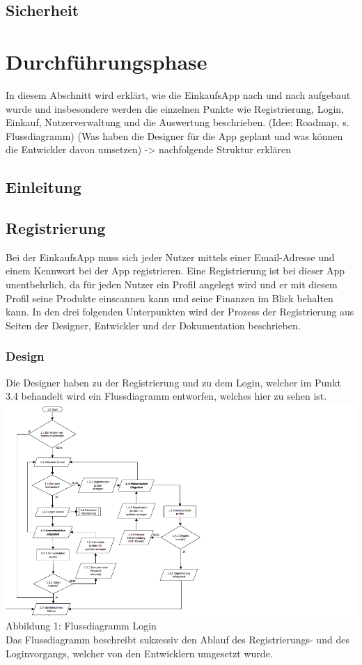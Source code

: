\documentclass[12pt,a4paper]{article}
\begin{document}
\subsection{Sicherheit}
\newpage
\section{Durchführungsphase}
In diesem Abschnitt wird erklärt, wie die EinkaufsApp nach und nach aufgebaut wurde und insbesondere werden die einzelnen Punkte wie Registrierung, Login, Einkauf, Nutzerverwaltung und die Auswertung beschrieben.
(Idee: Roadmap, s. Flussdiagramm) (Was haben die Designer für die App geplant und was können die Entwickler davon umsetzen) -> nachfolgende Struktur erklären
\subsection*{Einleitung}
\newpage
\subsection{Registrierung}
Bei der EinkaufsApp muss sich jeder Nutzer mittels einer Email-Adresse und einem Kennwort bei der App registrieren.
Eine Registrierung ist bei dieser App unentbehrlich, da für jeden Nutzer ein Profil angelegt wird und er mit diesem Profil seine Produkte einscannen kann und seine Finanzen im Blick behalten kann.
In den drei folgenden Unterpunkten wird der Prozess der Registrierung aus Seiten der Designer, Entwickler und der Dokumentation beschrieben.
\subsubsection*{Design}
Die Designer haben zu der Registrierung und zu dem Login, welcher im Punkt 3.4 behandelt wird ein Flussdiagramm entworfen, welches hier zu sehen ist.
\includegraphics[scale=0.6, origin=l]{Login-Registrierung.png}
\footnotesize Abbildung 1: Flussdiagramm Login
\normalsize
\\
\linebreak
Das Flussdiagramm beschreibt sukzessiv den Ablauf des Registrierungs- und des Loginvorgangs, welcher von den Entwicklern umgesetzt wurde.
\end{document}
